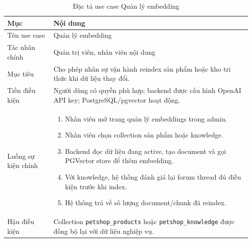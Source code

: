 \documentclass[../DoAn.tex]{subfiles}
\begin{document}
{\normalsize
\setlength{\LTleft}{\fill}
\setlength{\LTright}{\fill}
\setlength{\tabcolsep}{5pt}
\renewcommand{\arraystretch}{1.25}
\begin{longtable}{|p{3.2cm}|p{10.4cm}|}
\caption{Đặc tả use case Quản lý embedding}\\
\hline
\textbf{Mục} & \textbf{Nội dung} \\ \hline
Tên use case & Quản lý embedding \\ \hline
Tác nhân chính & Quản trị viên, nhân viên nội dung \\ \hline
Mục tiêu & Cho phép nhân sự vận hành reindex sản phẩm hoặc kho tri thức khi dữ liệu thay đổi. \\ \hline
Tiền điều kiện & Người dùng có quyền phù hợp; backend được cấu hình OpenAI API key; PostgreSQL/pgvector hoạt động. \\ \hline
Luồng sự kiện chính &
\begin{minipage}[t]{10.1cm}
\begin{enumerate}[leftmargin=*,topsep=0pt,itemsep=0pt]
    \item Nhân viên mở trang quản lý embeddings trong admin.
    \item Nhân viên chọn collection sản phẩm hoặc knowledge.
    \item Backend đọc dữ liệu đang active, tạo document và gọi PGVector store để thêm embedding.
    \item Với knowledge, hệ thống đánh giá lại forum thread đủ điều kiện trước khi index.
    \item Hệ thống trả về số lượng document/chunk đã reindex.
\end{enumerate}
\end{minipage} \\ \hline
Hậu điều kiện & Collection \texttt{petshop\_products} hoặc \texttt{petshop\_knowledge} được đồng bộ lại với dữ liệu nghiệp vụ. \\ \hline
\end{longtable}
}
\end{document}
